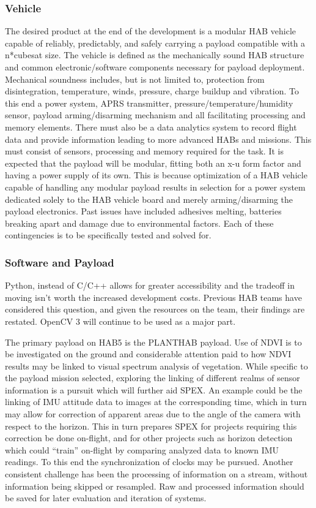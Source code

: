 \documentclass[conference]{IEEEtran} %
\begin{document}
\subsubsection{Vehicle}
\label{deliverables-vehicle}
The desired product at the end of the development is a modular HAB vehicle capable of reliably, predictably, and safely carrying a payload compatible with a n*cubesat size. 
The vehicle is defined as the mechanically sound HAB structure and common electronic/software components necessary for payload deployment. 
Mechanical soundness includes, but is not limited to, protection from disintegration, temperature, winds, pressure, charge buildup and vibration. 
To this end a power system, APRS transmitter, pressure/temperature/humidity sensor, payload arming/disarming mechanism and all facilitating processing and memory elements. 
There must also be a data analytics system to record flight data and provide information leading to more advanced HABs and missions. 
This must consist of sensors, processing and memory required for the task.
It is expected that the payload will be modular, fitting both an x-u form factor and having a power supply of its own. 
This is because optimization of a HAB vehicle capable of handling any modular payload results in selection for a power system dedicated solely to the HAB vehicle board and merely arming/disarming the payload electronics. 
Past issues have included adhesives melting, batteries breaking apart and damage due to environmental factors. Each of these contingencies is to be specifically tested and solved for.

\subsubsection{Software and Payload}
\label{deliverables-payload}
Python, instead of C/C++ allows for greater accessibility and the tradeoff in moving isn't worth the increased development costs. 
Previous HAB teams have considered this question, and given the resources on the team, their findings are restated. OpenCV 3 will continue to be used as a major part.

The primary payload on HAB5 is the PLANTHAB payload.
Use of NDVI is to be investigated on the ground and considerable attention paid to how NDVI results may be linked to visual spectrum analysis of vegetation. 
While specific to the payload mission selected, exploring the linking of different realms of sensor information is a pursuit which will further aid SPEX. 
An example could be the linking of IMU attitude data to images at the corresponding time, which in turn may allow for correction of apparent areas due to the angle of the camera with respect to the horizon. 
This in turn prepares SPEX for projects requiring this correction be done on-flight, and for other projects such as horizon detection which could ``train'' on-flight by comparing analyzed data to known IMU readings. 
To this end the synchronization of clocks may be pursued. 
Another consistent challenge has been the processing of information on a stream, without information being skipped or resampled. 
Raw and processed information should be saved for later evaluation and iteration of systems.
\end{document}

